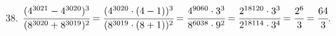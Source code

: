38. $\cfrac{(4^{3021}-4^{3020})^3}{(8^{3020}+8^{3019})^2}=\cfrac{(4^{3020}\cdot(4-1))^3}{(8^{3019}\cdot(8+1))^2}=
\cfrac{4^{9060}\cdot3^3}{8^{6038}\cdot9^2}=\cfrac{2^{18120}\cdot3^3}{2^{18114}\cdot3^4}=\cfrac{2^6}{3}=\cfrac{64}{3}.$\\

